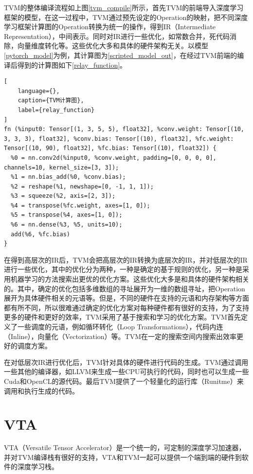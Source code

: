 TVM的整体编译流程如上图\ref{tvm_compile}所示，首先TVM的前端导入深度学习框架的模型，在这一过程中，TVM通过预先设定的Operation的映射，把不同深度学习框架计算图的Operation转换为统一的操作，得到IR（Intermediate Representation），中间表示。同时对IR进行一些优化，如常数合并，死代码消除，向量维度转化等。这些优化大多和具体的硬件架构无关。以模型\ref{pytorch_model}为例，其计算图为\ref{scripted_model_out}，在经过TVM前端的编译后得到的计算图如下\ref{relay_function}。

\begin{lstlisting}[
    language={},
    caption={TVM计算图},
    label={relay_function}
]
fn (%input0: Tensor[(1, 3, 5, 5), float32], %conv.weight: Tensor[(10, 3, 3, 3), float32], %conv.bias: Tensor[(10), float32], %fc.weight: Tensor[(10, 90), float32], %fc.bias: Tensor[(10), float32]) {
  %0 = nn.conv2d(%input0, %conv.weight, padding=[0, 0, 0, 0], channels=10, kernel_size=[3, 3]);
  %1 = nn.bias_add(%0, %conv.bias);
  %2 = reshape(%1, newshape=[0, -1, 1, 1]);
  %3 = squeeze(%2, axis=[2, 3]);
  %4 = transpose(%fc.weight, axes=[1, 0]);
  %5 = transpose(%4, axes=[1, 0]);
  %6 = nn.dense(%3, %5, units=10);
  add(%6, %fc.bias)
}
\end{lstlisting}

在得到高层次的IR后，TVM会把高层次的IR转换为底层次的IR，并对低层次的IR进行一些优化，其中的优化分为两种，一种是确定的基于规则的优化，另一种是采用机器学习的方法搜索出更优的优化方案。这些优化大多是和具体的硬件架构相关的。其中，确定的优化包括多维数组的寻址展开为一维的数组寻址，把Operation展开为具体硬件相关的元语等。但是，不同的硬件在支持的元语和内存架构等方面都有所不同，所以很难通过确定的优化方案对每种硬件都有很好的支持，为了支持更多的硬件和更好的效率，TVM采用了基于搜索和学习的优化方案。TVM首先定义了一些调度的元语，例如循环转化（Loop Transformations），代码内连（Inline），向量化（Vectorization）等。TVM在一定的搜索空间内搜索出效率更好的调度方案。

在对低层次IR进行优化后，TVM针对具体的硬件进行代码的生成。TVM通过调用一些其他的编译器，如LLVM来生成一些CPU可执行的代码，同时也可以生成一些Cuda和OpenCL的源代码。最后TVM提供了一个轻量化的运行库（Runitme）来调用和执行生成的代码。


\section{VTA}


VTA（Versatile Tensor Accelerator）是一个统一的，可定制的深度学习加速器，并对TVM编译栈有很好的支持，VTA和TVM一起可以提供一个端到端的硬件到软件的深度学习栈。

